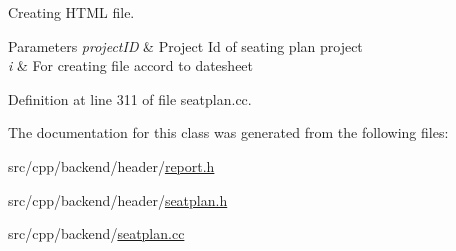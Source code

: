 Creating H\-T\-M\-L file. 


\begin{DoxyParams}{Parameters}
{\em project\-I\-D} & Project Id of seating plan project \\
\hline
{\em i} & For creating file accord to datesheet \\
\hline
\end{DoxyParams}


Definition at line 311 of file seatplan.\-cc.



The documentation for this class was generated from the following files\-:\begin{DoxyCompactItemize}
\item 
src/cpp/backend/header/\hyperlink{report_8h}{report.\-h}\item 
src/cpp/backend/header/\hyperlink{seatplan_8h}{seatplan.\-h}\item 
src/cpp/backend/\hyperlink{seatplan_8cc}{seatplan.\-cc}\end{DoxyCompactItemize}
